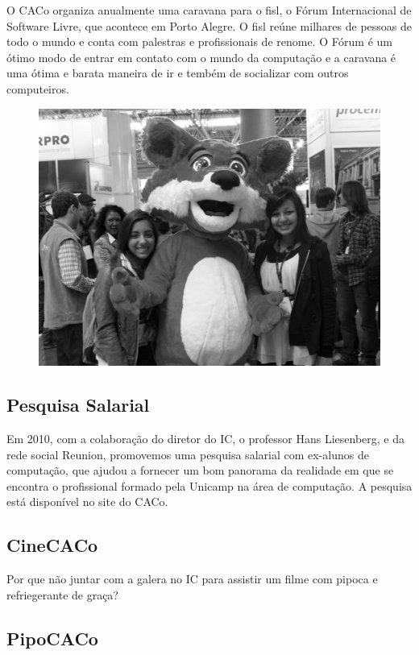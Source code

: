 O CACo organiza anualmente uma caravana para o fisl, o Fórum Internacional de
Software Livre, que acontece em Porto Alegre. O fisl reúne milhares de pessoas
de todo o mundo e conta com palestras e profissionais de renome. O Fórum é um
ótimo modo de entrar em contato com o mundo da computação e a caravana é uma
ótima e barata maneira de ir e tembém de socializar com outros computeiros.

\begin{figure}[H]
    \centering
    \includegraphics[scale=0.21]{img/caco/fisl.jpg}
\end{figure}

\subsection{Pesquisa Salarial}

Em 2010, com a colaboração do diretor do IC, o professor Hans Liesenberg,
e da rede social Reunion, promovemos uma pesquisa salarial com
ex-alunos de computação, que ajudou a fornecer um bom panorama da realidade em que se encontra
o profissional formado pela Unicamp na área de computação. A pesquisa
está disponível no site do CACo.

\subsection{CineCACo}

Por que não juntar com a galera no IC para assistir um filme com pipoca e
refriegerante de graça?

\subsection{PipoCACo}

